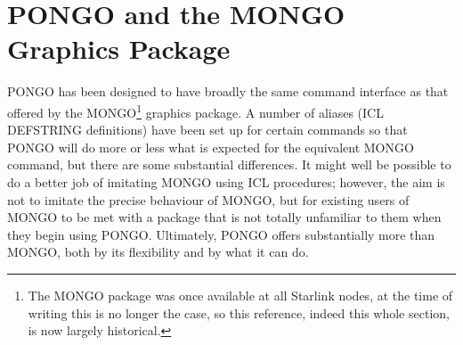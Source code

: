 \documentclass[twoside,11pt]{article}
\renewcommand{\_}{\texttt{\symbol{95}}}
\begin{document}
\newpage
\section{PONGO and the MONGO Graphics Package}

PONGO has been designed to have broadly the same command interface as
that offered by the MONGO\footnote{The MONGO package was once
available at all Starlink nodes, at the time of writing this is no
longer the case, so this reference, indeed this whole section, is now
largely historical.} graphics package.  A number of aliases (ICL
DEFSTRING definitions) have been set up for certain commands so that
PONGO will do more or less what is expected for the equivalent MONGO
command, but there are some substantial differences.  It might well be
possible to do a better job of imitating MONGO using ICL procedures;
however, the aim is not to imitate the precise behaviour of MONGO, but
for existing users of MONGO to be met with a package that is not
totally unfamiliar to them when they begin using PONGO.  Ultimately,
PONGO offers substantially more than MONGO, both by its flexibility
and by what it can do.
\end{document}
